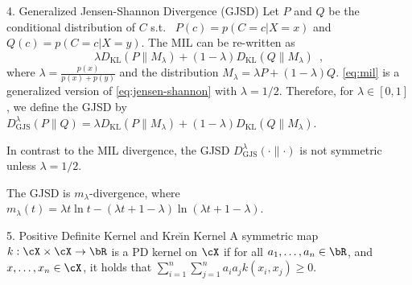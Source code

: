 \documentclass[final]{beamer}
\newcommand{\kr}{Kre\u{\i}n\xspace}
\newcommand{\kl}[2]{D_{\mathrm{KL}}( #1 \parallel #2 )}
\newcommand{\js}[2]{D_{\mathrm{JS}}( #1 \parallel #2 )}
\newcommand{\wjs}[3]{D_{\mathrm{GJS}}^{#1}( #2 \parallel #3 )}
\newlength{\onecolwid}
\begin{document}
\begin{frame}[t]
\begin{columns}[t]
\begin{column}{\onecolwid}
\begin{block}{4. Generalized Jensen-Shannon Divergence (GJSD)}
	 Let $P$ 
	and 
	$Q$ be the conditional distribution of $C$ s.t.\
	$ P(c) = p(C=c| X=x) $ and $ Q(c)=p(C=c| X=y) $. The MIL can be 
	re-written as
	\begin{equation}\label{eq:mil}
	\lambda \kl{P}{M_\lambda} + (1-\lambda) \kl{Q}{M_\lambda}\enspace,
	\end{equation}
	where  $\lambda=\frac{p(x)}{p(x)+p(y)}$ and the distribution $ 
	M_\lambda=\lambda P + (1-\lambda)Q $.
	\eqref{eq:mil} is a generalized version of 
	\eqref{eq:jensen-shannon} with $ \lambda=1/2 $. 
	Therefore, for $ \lambda\in [0,1] $, we define the 
	GJSD
	by
	$
	\wjs{\lambda}{P}{Q} = \lambda \kl{P}{M_\lambda} + (1-\lambda) 
	\kl{Q}{M_\lambda}$.

	
	 In 
	contrast to the MIL 
	divergence, the GJSD $ \wjs{\lambda}{\cdot}{\cdot} $ is not symmetric 
	unless 
	$ \lambda=1/2 $.

 The GJSD is  $ m_\lambda $-divergence, where $	
m_\lambda(t) = \lambda t \ln t - (\lambda t + 1 - 
\lambda)\ln(\lambda t+1-\lambda)$.
\end{block}	
\vspace{3pt}

\begin{block}{5. Positive Definite Kernel and \kr Kernel}
		 A symmetric
		  map $ 
		k:\cX\times\cX\to \bR $ is a PD kernel on $ \cX $ if for 
		all 
		  $ a_1,\dots,a_n\in \bR $, and $ 
		x,\dots,x_n\in \cX $, it holds that $
		\sum_{i=1}^n \sum_{j=1}^n a_i a_j k(x_i,x_j) \ge 0$.
	
	

\end{block}
\end{column}
\end{columns}
\end{frame}
\end{document}
